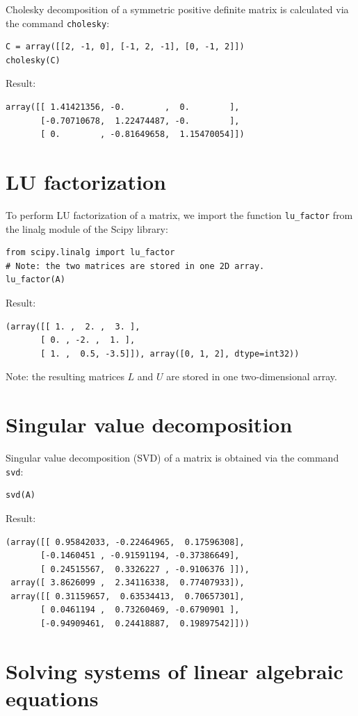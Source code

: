 \documentclass{article}
\begin{document}
Cholesky decomposition of a symmetric positive definite matrix is 
calculated via the command {\tt cholesky}:
\begin{verbatim}
C = array([[2, -1, 0], [-1, 2, -1], [0, -1, 2]])
cholesky(C)
\end{verbatim}
Result:
\begin{verbatim}
array([[ 1.41421356, -0.        ,  0.        ],
       [-0.70710678,  1.22474487, -0.        ],
       [ 0.        , -0.81649658,  1.15470054]])
\end{verbatim}

\section{LU factorization}

To perform LU factorization of a matrix, we import the function {\tt lu\_factor}
from the linalg module of the Scipy library:
\begin{verbatim}
from scipy.linalg import lu_factor
# Note: the two matrices are stored in one 2D array.
lu_factor(A)
\end{verbatim}
Result:
\begin{verbatim}
(array([[ 1. ,  2. ,  3. ],
       [ 0. , -2. ,  1. ],
       [ 1. ,  0.5, -3.5]]), array([0, 1, 2], dtype=int32))
\end{verbatim}
Note: the resulting matrices $L$ and $U$ are stored in one two-dimensional array.

\section{Singular value decomposition}

Singular value decomposition (SVD) of a matrix is obtained via the command {\tt svd}:
\begin{verbatim}
svd(A)
\end{verbatim}
Result:
\begin{verbatim}
(array([[ 0.95842033, -0.22464965,  0.17596308],
       [-0.1460451 , -0.91591194, -0.37386649],
       [ 0.24515567,  0.3326227 , -0.9106376 ]]), 
 array([ 3.8626099 ,  2.34116338,  0.77407933]), 
 array([[ 0.31159657,  0.63534413,  0.70657301],
       [ 0.0461194 ,  0.73260469, -0.6790901 ],
       [-0.94909461,  0.24418887,  0.19897542]]))
\end{verbatim}


\section{Solving systems of linear algebraic equations}
\end{document}
